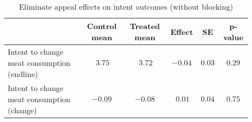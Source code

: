 \begin{table*}[ht]
\caption{Eliminate appeal effects on intent outcomes (without blocking)\label{round}} 
\begin{center}
\begin{tabular}{lccccc}
\hline\hline
\multicolumn{1}{l}{}&\multicolumn{1}{c}{Control mean}&\multicolumn{1}{c}{Treated mean}&\multicolumn{1}{c}{Effect}&\multicolumn{1}{c}{SE}&\multicolumn{1}{c}{p-value}\tabularnewline
\hline
Intent to change meat consumption (endline)&$~3.75$&$~3.72$&$-0.04$&$0.03$&$0.29$\tabularnewline
Intent to change meat consumption (change)&$-0.09$&$-0.08$&$~0.01$&$0.04$&$0.75$\tabularnewline
\hline
\end{tabular}\end{center}

\end{table*}
